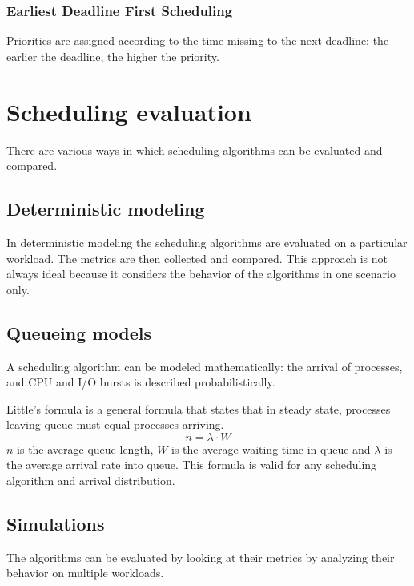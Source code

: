 
\subsubsection{Earliest Deadline First Scheduling}
Priorities are assigned according to the time missing to the next deadline: the earlier the deadline, the higher the priority.


\section{Scheduling evaluation}
There are various ways in which scheduling algorithms can be evaluated and compared.

\subsection{Deterministic modeling}
In deterministic modeling the scheduling algorithms are evaluated on a particular workload. The metrics are then collected and compared. This approach is not always ideal because it considers the behavior of the algorithms in one scenario only.

\subsection{Queueing models}
A scheduling algorithm can be modeled mathematically: the arrival of processes, and CPU and I/O bursts is described probabilistically.

Little's formula is a general formula that states that in steady state, processes leaving queue must equal processes arriving.
$$ n = \lambda \cdot W $$
$n$ is the average queue length, $W$ is the average waiting time in queue and $\lambda$ is the average arrival rate into queue. This formula is valid for any scheduling algorithm and arrival distribution.

\subsection{Simulations}
The algorithms can be evaluated by looking at their metrics by analyzing their behavior on multiple workloads.